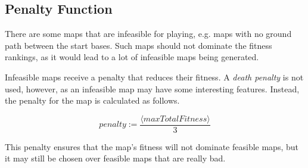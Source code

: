 \subsection{Penalty Function}
\label{methodology_mapfitness_penalty}
There are some maps that are infeasible for playing, e.g. maps with no ground path between the start bases. Such maps should not dominate the fitness rankings, as it would lead to a lot of infeasible maps being generated. 

Infeasible maps receive a penalty that reduces their fitness. A \textit{death penalty}\cite{coello2012constraint} is not used, however, as an infeasible map may have some interesting features. Instead, the penalty for the map is calculated as follows.

\begin{equation}
	penalty := \frac{\langle maxTotalFitness\rangle}{3}
\end{equation}

This penalty ensures that the map's fitness will not dominate feasible maps, but it may still be chosen over feasible maps that are really bad.